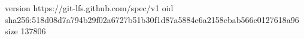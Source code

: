 version https://git-lfs.github.com/spec/v1
oid sha256:518d08d7a794b29f02a6727b51b30f1d87a5884e6a2158ebab566c0127618a96
size 137806

